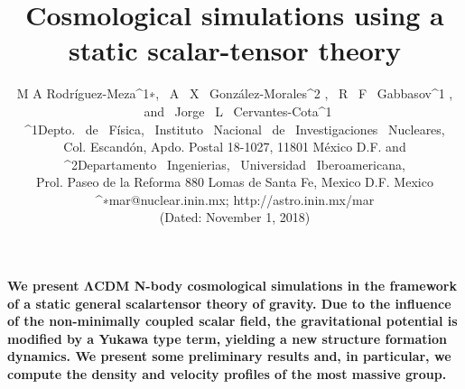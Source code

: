 \documentclass[10pt,journal]{IEEEtran}
\begin{document}
\title{Cosmological simulations using a static scalar-tensor theory}

\author{M A Rodríguez-Meza^{1∗}, \ A \ X \ González-Morales^{2}
, \ R \ F \ Gabbasov^{1}
, \ and \ Jorge \ L \ Cervantes-Cota^1 \\
^1Depto. \ de \ Física, \ Instituto \ Nacional \ de \ Investigaciones \ Nucleares, \\
Col. Escandón, Apdo. Postal 18-1027, 11801 México D.F. and \\
^2Departamento \ Ingenierias, \ Universidad \ Iberoamericana, \\
Prol. Paseo de la Reforma 880 Lomas de Santa Fe, Mexico D.F. Mexico \\
^∗mar@nuclear.inin.mx; http://astro.inin.mx/mar \\ (Dated: November 1, 2018)}

\maketitle{}  
\textbf{We present ΛCDM N-body cosmological simulations in the framework of a static general scalartensor theory of gravity. Due to the influence of the non-minimally coupled scalar field, the gravitational potential is modified by a Yukawa type term, yielding a new structure formation dynamics.
We present some preliminary results and, in particular, we compute the density and velocity profiles
of the most massive group.}
\end{document}
